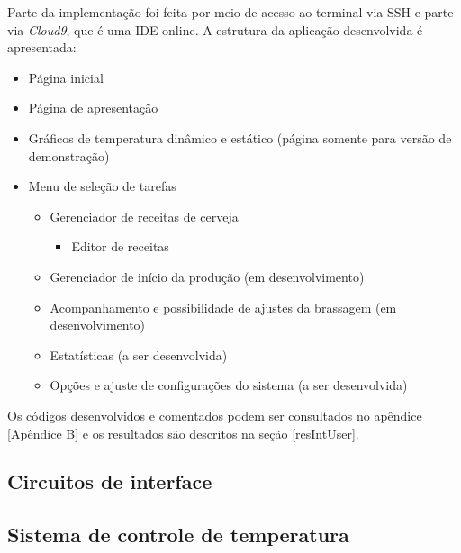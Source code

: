 Parte da implementação foi feita por meio de acesso ao terminal via SSH e parte via \textit{Cloud9}, que é uma IDE online. A estrutura da aplicação desenvolvida é apresentada:

\begin{itemize}
	\item Página inicial
	\item Página de apresentação
	\item Gráficos de temperatura dinâmico e estático (página somente para versão de demonstração)
	\item Menu de seleção de tarefas
	\begin{itemize}
		\item Gerenciador de receitas de cerveja
		\begin{itemize}
			\item Editor de receitas
		\end{itemize}
		\item Gerenciador de início da produção (em desenvolvimento)
		\item Acompanhamento e possibilidade de ajustes da brassagem (em desenvolvimento)
		\item Estatísticas (a ser desenvolvida)
		\item Opções e ajuste de configurações do sistema (a ser desenvolvida)
	\end{itemize}
\end{itemize}

Os códigos desenvolvidos e comentados podem ser consultados no apêndice \ref{Apêndice B} e os resultados são descritos na seção \ref{resIntUser}.

\subsection{Circuitos de interface}

\subsection{Sistema de controle de temperatura}

